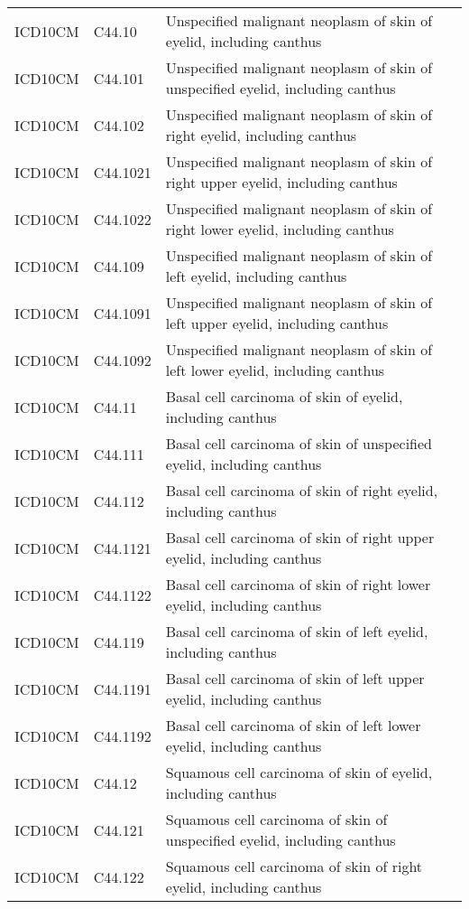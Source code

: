 \begin{table}[ht]
\begin{tabular}{lll}
  ICD10CM & C44.10 & Unspecified malignant neoplasm of skin of eyelid, including canthus \\ 
  ICD10CM & C44.101 & Unspecified malignant neoplasm of skin of unspecified eyelid, including canthus \\ 
  ICD10CM & C44.102 & Unspecified malignant neoplasm of skin of right eyelid, including canthus \\ 
  ICD10CM & C44.1021 & Unspecified malignant neoplasm of skin of right upper eyelid, including canthus \\ 
  ICD10CM & C44.1022 & Unspecified malignant neoplasm of skin of right lower eyelid, including canthus \\ 
  ICD10CM & C44.109 & Unspecified malignant neoplasm of skin of left eyelid, including canthus \\ 
  ICD10CM & C44.1091 & Unspecified malignant neoplasm of skin of left upper eyelid, including canthus \\ 
  ICD10CM & C44.1092 & Unspecified malignant neoplasm of skin of left lower eyelid, including canthus \\ 
  ICD10CM & C44.11 & Basal cell carcinoma of skin of eyelid, including canthus \\ 
  ICD10CM & C44.111 & Basal cell carcinoma of skin of unspecified eyelid, including canthus \\ 
  ICD10CM & C44.112 & Basal cell carcinoma of skin of right eyelid, including canthus \\ 
  ICD10CM & C44.1121 & Basal cell carcinoma of skin of right upper eyelid, including canthus \\ 
  ICD10CM & C44.1122 & Basal cell carcinoma of skin of right lower eyelid, including canthus \\ 
  ICD10CM & C44.119 & Basal cell carcinoma of skin of left eyelid, including canthus \\ 
  ICD10CM & C44.1191 & Basal cell carcinoma of skin of left upper eyelid, including canthus \\ 
  ICD10CM & C44.1192 & Basal cell carcinoma of skin of left lower eyelid, including canthus \\ 
  ICD10CM & C44.12 & Squamous cell carcinoma of skin of eyelid, including canthus \\ 
  ICD10CM & C44.121 & Squamous cell carcinoma of skin of unspecified eyelid, including canthus \\ 
  ICD10CM & C44.122 & Squamous cell carcinoma of skin of right eyelid, including canthus \\ 

\end{tabular}
\end{table}
